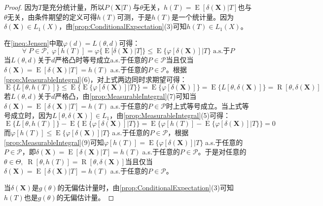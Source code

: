 \begin{proof}
	因为$T$是充分统计量，所以$P(\mathbf{X}|T)$与$\theta$无关，$h(T)=\operatorname{E}[\delta(\mathbf{X})|T]$也与$\theta$无关，由条件期望的定义可得$h(T)$可测，于是$h(T)$是一个统计量。因为$\delta(\mathbf{X})\in L_1(X)$，由\cref{prop:ConditionalExpectation}(3)可知$h(T)\in L_1(X)$。\par
	在\cref{ineq:Jensen}中取$\varphi(d)=L(\theta,d)$可得：
	\begin{equation*}
		\forall\;P\in\mathscr{P},\;\varphi[h(T)]=\varphi\{\operatorname{E}[\delta(\mathbf{X})|T]\}\leqslant\operatorname{E}\{\varphi[\delta(\mathbf{X})]|T\}\;\text{a.s.于}P
	\end{equation*}
	当$L(\theta,d)$关于$d$严格凸时等号成立a.s.于任意的$P\in\mathscr{P}$当且仅当$\delta(\mathbf{X})=\operatorname{E}[\delta(\mathbf{X})|T]=h(T)\;$a.s.于任意的$P\in\mathscr{P}$。根据\cref{prop:MeasurableIntegral}(6)，对上式两边同时求期望可得：
	\begin{equation*}
		\operatorname{E}\{L[\theta,h(T)]\}\leqslant\operatorname{E}\Big\{\operatorname{E}\{\varphi[\delta(\mathbf{X})]|T\}\Big\}=\operatorname{E}\{\varphi[\delta(\mathbf{X})]\}=\operatorname{E}\{L[\theta,\delta(\mathbf{X})]\}=\operatorname{R}[\theta,\delta(\mathbf{X})]
	\end{equation*}
	若$L(\theta,d)$关于$d$严格凸，由\cref{prop:MeasurableIntegral}(7)可知当$\delta(\mathbf{X})=\operatorname{E}[\delta(\mathbf{X})|T]=h(T)\;$a.s.于任意的$P\in\mathscr{P}$时上式等号成立。当上式等号成立时，因为$L[\theta,\delta(\mathbf{X})]\in L_1$，由\cref{prop:MeasurableIntegral}(5)可得：
	\begin{equation*}
		\operatorname{E}\{L[\theta,h(T)]\}-\operatorname{E}\Big\{\operatorname{E}\{\varphi[\delta(\mathbf{X})]|T\}\Big\}=\operatorname{E}\Big\{\varphi[h(T)]-\operatorname{E}\{\varphi[\delta(\mathbf{X})]|T\}\Big\}=0
	\end{equation*}
	而$\varphi[h(T)]\leqslant\operatorname{E}\{\varphi[\delta(\mathbf{X})]|T\}\;$a.s.于任意的$P\in\mathscr{P}$，根据\cref{prop:MeasurableIntegral}(9)可知$\varphi[h(T)]=\operatorname{E}\{\varphi[\delta(\mathbf{X})]|T\}\;$a.s.于任意的$P\in\mathscr{P}$，即$\delta(\mathbf{X})=\operatorname{E}[\delta(\mathbf{X})|T]=h(T)\;$a.s.于任意的$P\in\mathscr{P}$。于是对任意的$\theta\in\Theta,\;\operatorname{R}[\theta,h(T)]=\operatorname{R}[\theta,\delta(\mathbf{X})]$当且仅当$\delta(\mathbf{X})=\operatorname{E}[\delta(\mathbf{X})|T]=h(T)\;$a.s.于任意的$P\in\mathscr{P}$。\par
	当$\delta(\mathbf{X})$是$g(\theta)$的无偏估计量时，由\cref{prop:ConditionalExpectation}(3)可知$h(T)$也是$g(\theta)$的无偏估计量。
\end{proof}
